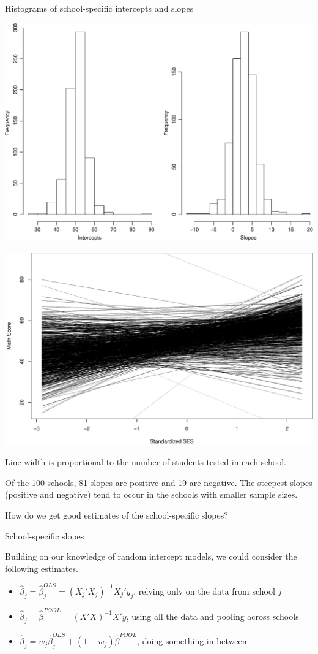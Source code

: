 \documentclass[ignorenonframetext,]{beamer}
\begin{document}
\begin{frame}{Histograms of school-specific intercepts and slopes}

\includegraphics{ancova_01_deck_files/figure-beamer/hist-1.pdf}

\end{frame}

\begin{frame}{}

\includegraphics[width=0.5\linewidth]{ancova_01_deck_files/figure-beamer/schoolspecific2c-1}

Line width is proportional to the number of students tested in each
school.

Of the 100 schools, 81 slopes are positive and 19 are negative. The
steepest slopes (positive and negative) tend to occur in the schools
with smaller sample sizes.

How do we get good estimates of the school-specific slopes?

\end{frame}

\begin{frame}{School-specific slopes}

Building on our knowledge of random intercept models, we could consider
the following estimates.

\begin{itemize}
\item
  \(\widehat{\beta}_j=\widehat{\beta}_j^{OLS}=(X_j'X_j)^{-1}X_j'y_j\),
  relying only on the data from school \(j\)
\item
  \(\widehat{\beta}_j=\widehat{\beta}^{POOL}=(X'X)^{-1}X'y\), using all
  the data and pooling across schools
\item
  \(\widehat{\beta}_j=w_j\widehat{\beta}_j^{OLS} + (1-w_j)\widehat{\beta}^{POOL}\),
  doing something in between
\end{itemize}

\end{frame}
\end{document}
